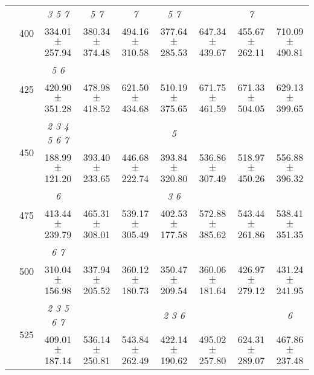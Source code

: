 \begin{table}[h]
{\begin{tabular}{
        ccccccccc}
 & \multirow{2}{*}{400}& \textit{ 3 5 7 }& \textit{ 5 7 }& \textit{ 7 }& \textit{ 5 7 }& & \textit{ 7 }&  \\ 
 & & 334.01 $\pm$ 257.94& 380.34 $\pm$ 374.48& 494.16 $\pm$ 310.58& 377.64 $\pm$ 285.53& 647.34 $\pm$ 439.67& 455.67 $\pm$ 262.11& 710.09 $\pm$ 490.81 \\ 
 & \multirow{2}{*}{425}& \cellcolor[HTML]{EFEFEF} \textit{ 5 6 }& \cellcolor[HTML]{EFEFEF} & \cellcolor[HTML]{EFEFEF} & \cellcolor[HTML]{EFEFEF} & \cellcolor[HTML]{EFEFEF} & \cellcolor[HTML]{EFEFEF} & \cellcolor[HTML]{EFEFEF}  \\ 
 & & \cellcolor[HTML]{EFEFEF} 420.90 $\pm$ 351.28& \cellcolor[HTML]{EFEFEF} 478.98 $\pm$ 418.52& \cellcolor[HTML]{EFEFEF} 621.50 $\pm$ 434.68& \cellcolor[HTML]{EFEFEF} 510.19 $\pm$ 375.65& \cellcolor[HTML]{EFEFEF} 671.75 $\pm$ 461.59& \cellcolor[HTML]{EFEFEF} 671.33 $\pm$ 504.05& \cellcolor[HTML]{EFEFEF} 629.13 $\pm$ 399.65 \\ 
 & \multirow{2}{*}{450}& \textit{ 2 3 4 5 6 7 }& & & \textit{ 5 }& & &  \\ 
 & & 188.99 $\pm$ 121.20& 393.40 $\pm$ 233.65& 446.68 $\pm$ 222.74& 393.84 $\pm$ 320.80& 536.86 $\pm$ 307.49& 518.97 $\pm$ 450.26& 556.88 $\pm$ 396.32 \\ 
 & \multirow{2}{*}{475}& \cellcolor[HTML]{EFEFEF} \textit{ 6 }& \cellcolor[HTML]{EFEFEF} & \cellcolor[HTML]{EFEFEF} & \cellcolor[HTML]{EFEFEF} \textit{ 3 6 }& \cellcolor[HTML]{EFEFEF} & \cellcolor[HTML]{EFEFEF} & \cellcolor[HTML]{EFEFEF}  \\ 
 & & \cellcolor[HTML]{EFEFEF} 413.44 $\pm$ 239.79& \cellcolor[HTML]{EFEFEF} 465.31 $\pm$ 308.01& \cellcolor[HTML]{EFEFEF} 539.17 $\pm$ 305.49& \cellcolor[HTML]{EFEFEF} 402.53 $\pm$ 177.58& \cellcolor[HTML]{EFEFEF} 572.88 $\pm$ 385.62& \cellcolor[HTML]{EFEFEF} 543.44 $\pm$ 261.86& \cellcolor[HTML]{EFEFEF} 538.41 $\pm$ 351.35 \\ 
 & \multirow{2}{*}{500}& \textit{ 6 7 }& & & & & &  \\ 
 & & 310.04 $\pm$ 156.98& 337.94 $\pm$ 205.52& 360.12 $\pm$ 180.73& 350.47 $\pm$ 209.54& 360.06 $\pm$ 181.64& 426.97 $\pm$ 279.12& 431.24 $\pm$ 241.95 \\ 
 & \multirow{2}{*}{525}& \cellcolor[HTML]{EFEFEF} \textit{ 2 3 5 6 7 }& \cellcolor[HTML]{EFEFEF} & \cellcolor[HTML]{EFEFEF} & \cellcolor[HTML]{EFEFEF} \textit{ 2 3 6 }& \cellcolor[HTML]{EFEFEF} & \cellcolor[HTML]{EFEFEF} & \cellcolor[HTML]{EFEFEF} \textit{ 6 } \\ 
 & & \cellcolor[HTML]{EFEFEF} 409.01 $\pm$ 187.14& \cellcolor[HTML]{EFEFEF} 536.14 $\pm$ 250.81& \cellcolor[HTML]{EFEFEF} 543.84 $\pm$ 262.49& \cellcolor[HTML]{EFEFEF} 422.14 $\pm$ 190.62& \cellcolor[HTML]{EFEFEF} 495.02 $\pm$ 257.80& \cellcolor[HTML]{EFEFEF} 624.31 $\pm$ 289.07& \cellcolor[HTML]{EFEFEF} 467.86 $\pm$ 237.48 \\ 

\end{tabular}}
\end{table}
